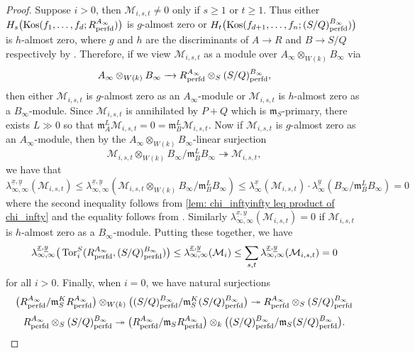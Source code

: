 \documentclass[12pt]{amsart}
\numberwithin{equation}{theorem}
\numberwithin{equation}{theorem}
\renewcommand{\m}{\mathfrak{m}}
\newcommand{\perfd}{\textnormal{perfd}}
\newcommand{\Kos}{\textnormal{Kos}}
\begin{document}
\begin{proof}
Suppose $i>0$, then $\mathcal{M}_{i,s,t}\neq 0$ only if $s\geq 1$ or $t\geq 1$. Thus either $H_s\big(\Kos(f_1,\dots,f_d; R^{A_\infty}_\perfd)\big)$ is $g$-almost zero or $H_t\big(\Kos(f_{d+1},\dots, f_n; (S/Q)^{B_\infty}_\perfd)\big)$ is $h$-almost zero, where $g$ and $h$ are the discriminants of $A\to R$ and $B\to S/Q$ respectively by \cite[Corollary 4.0.4]{CaiLeeMaSchwedeTuckerPerfdSignature2026}. Therefore, if we view $\mathcal{M}_{i,s,t}$ as a module over $A_\infty\otimes_{W(k)}B_\infty$ via 
$$A_\infty\otimes_{W(k)}B_\infty \to R^{A_\infty}_\perfd\otimes_S(S/Q)^{B_\infty}_\perfd,$$
then either $\mathcal{M}_{i,s,t}$ is $g$-almost zero as an $A_\infty$-module or $\mathcal{M}_{i,s,t}$ is $h$-almost zero as a $B_\infty$-module. Since $\mathcal{M}_{i,s,t}$ is annihilated by $P+Q$ which is $\m_S$-primary, there exists $L\gg0$ so that $\m_A^L\mathcal{M}_{i,s,t}=0=\m_B^L\mathcal{M}_{i,s,t}$. Now if $\mathcal{M}_{i,s,t}$ is $g$-almost zero as an $A_\infty$-module, then by the $A_\infty\otimes_{W(k)}B_\infty$-linear surjection
$$\mathcal{M}_{i,s,t} \otimes_{W(k)}B_\infty/\m_B^LB_\infty \twoheadrightarrow\mathcal{M}_{i,s,t},$$
we have that
$$\lambda_{\infty, \infty}^{\underline{x}, \underline{y}}(\mathcal{M}_{i,s,t}) \leq \lambda_{\infty, \infty}^{\underline{x}, \underline{y}}(\mathcal{M}_{i,s,t} \otimes_{W(k)}B_\infty/\m_B^LB_\infty)\leq \lambda_\infty^{\underline{x}}(\mathcal{M}_{i,s,t})\cdot \lambda_\infty^{\underline{y}}(B_\infty/\m_B^LB_\infty)=0$$
where the second inequality follows from \autoref{lem: chi_inftyinfty leq product of chi_infty} and the equality follows from \cite[Proposition 4.0.10]{CaiLeeMaSchwedeTuckerPerfdSignature2026}. Similarly $\lambda_{\infty, \infty}^{\underline{x}, \underline{y}}(\mathcal{M}_{i,s,t})=0$ if $\mathcal{M}_{i,s,t}$ is $h$-almost zero as a $B_\infty$-module. Putting these together, we have 
$$\lambda_{\infty, \infty}^{\underline{x}, \underline{y}}\big(\Tor_i^S(R^{A_\infty}_\perfd, (S/Q)^{B_\infty}_\perfd)\big)\leq \lambda_{\infty, \infty}^{\underline{x}, \underline{y}}(\mathcal{M}_{i}) \leq \sum_{s,t} \lambda_{\infty, \infty}^{\underline{x}, \underline{y}}(\mathcal{M}_{i,s,t}) =0$$
for all $i>0$. Finally, when $i=0$, we have natural surjections
$$\big(R^{A_\infty}_\perfd/\m_S^K R^{A_\infty}_\perfd\big)\otimes_{W(k)}\big((S/Q)^{B_\infty}_\perfd/\m^K_S(S/Q)^{B_\infty}_\perfd\big) \twoheadrightarrow R^{A_\infty}_\perfd\otimes_S(S/Q)^{B_\infty}_\perfd$$
$$R^{A_\infty}_\perfd\otimes_S(S/Q)^{B_\infty}_\perfd \twoheadrightarrow \big(R^{A_\infty}_\perfd/\m_S R^{A_\infty}_\perfd\big)\otimes_{k}\big((S/Q)^{B_\infty}_\perfd/\m_S(S/Q)^{B_\infty}_\perfd\big).$$

\end{proof}
\end{document}
